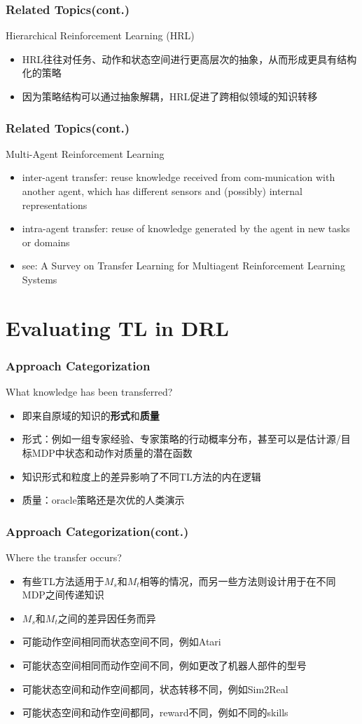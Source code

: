 \documentclass[aspectratio=169]{beamer}
\begin{document}
\begin{frame}
  \frametitle{Related Topics(cont.)}
  Hierarchical Reinforcement Learning (HRL)
  \begin{itemize}
    \item HRL往往对任务、动作和状态空间进行更高层次的抽象，从而形成更具有结构化的策略
    \item  因为策略结构可以通过抽象解耦，HRL促进了跨相似领域的知识转移
  \end{itemize}
\end{frame}

\begin{frame}
  \frametitle{Related Topics(cont.)}
  Multi-Agent Reinforcement Learning
  \begin{itemize}
    \item inter-agent transfer: reuse knowledge  received from com-munication with another agent, which has different sensors and (possibly) internal representations
    \item intra-agent transfer: reuse of knowledge generated by the agent in new tasks or domains
    \item see: A Survey on Transfer Learning for Multiagent Reinforcement Learning Systems
  \end{itemize}
\end{frame}

\section{Evaluating TL in DRL}

\begin{frame}
  \frametitle{Approach Categorization}
  What knowledge has been transferred?
  \begin{itemize}
    \item 即来自原域的知识的\textbf{形式}和\textbf{质量}
    \item 形式：例如一组专家经验、专家策略的行动概率分布，甚至可以是估计源/目标MDP中状态和动作对质量的潜在函数
    \item 知识形式和粒度上的差异影响了不同TL方法的内在逻辑
    \item 质量：oracle策略还是次优的人类演示
  \end{itemize}
\end{frame}

\begin{frame}
  \frametitle{Approach Categorization(cont.)}
  Where the transfer occurs?
  \begin{itemize}
    \item 有些TL方法适用于$M_s$和$M_t$相等的情况，而另一些方法则设计用于在不同MDP之间传递知识
    \item $M_s$和$M_t$之间的差异因任务而异
    \item 可能动作空间相同而状态空间不同，例如Atari
    \item 可能状态空间相同而动作空间不同，例如更改了机器人部件的型号
    \item 可能状态空间和动作空间都同，状态转移不同，例如Sim2Real
    \item 可能状态空间和动作空间都同，reward不同，例如不同的skills
  \end{itemize}
\end{frame}
\end{document}
